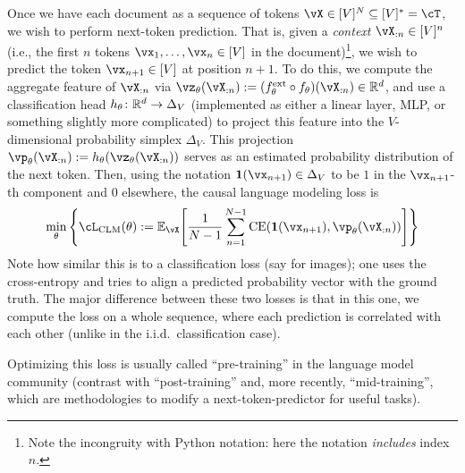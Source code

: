 \documentclass[../../book-main.tex]{subfiles}
\begin{document}
Once we have each document as a sequence of tokens \(\vX \in [V]^{N} \subseteq [V]^{*} = \cT\), we wish to perform next-token prediction. That is, given a \textit{context} \(\vX_{:n} \in [V]^{n}\) (i.e., the first \(n\) tokens \(\vx_{1}, \dots, \vx_{n} \in [V]\) in the document)\footnote{Note the incongruity with Python notation: here the notation \textit{includes} index \(n\).}, we wish to predict the token \(\vx_{n + 1} \in [V]\) at position \(n + 1\). To do this, we compute the aggregate feature of \(\vX_{:n}\) via \(\vz_{\theta}(\vX_{:n}) := (f_{\theta}^{\ext} \circ f_{\theta})(\vX_{:n}) \in \R^{d}\), and use a classification head \(h_{\theta} \colon \mathbb{R}^{d} \to \Delta_{V}\) (implemented as either a linear layer, MLP, or something slightly more complicated) to project this feature into the \(V\)-dimensional probability simplex \(\Delta_{V}\). This projection \(\vp_{\theta}(\vX_{:n}) := h_{\theta}(\vz_{\theta}(\vX_{:n}))\) serves as an estimated probability distribution of the next token. Then, using the notation \(\vone(\vx_{n + 1}) \in \Delta_{V}\) to be \(1\) in the \(\vx_{n + 1}\)-th component and \(0\) elsewhere, the causal language modeling loss is
\begin{equation}\label{eq:clm_loss}
    \min_{\theta}\bc{\cL_{\mathrm{CLM}}(\theta) := \Ex_{\vX}\rs{\frac{1}{N - 1}\sum_{n = 1}^{N - 1}\CE(\vone(\vx_{n + 1}), \vp_{\theta}(\vX_{:n}))}}
\end{equation}
Note how similar this is to a classification loss (say for images); one uses the cross-entropy and tries to align a predicted probability vector with the ground truth. The major difference between these two losses is that in this one, we compute the loss on a whole sequence, where each prediction is correlated with each other (unlike in the i.i.d.~classification case). 

Optimizing this loss is usually called ``pre-training'' in the language model community (contrast with ``post-training'' and, more recently, ``mid-training'', which are methodologies to modify a next-token-predictor for useful tasks).
\end{document}
